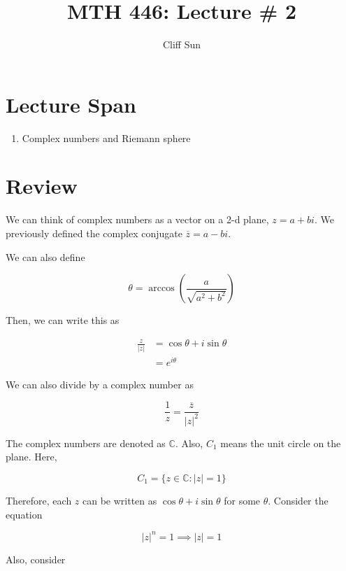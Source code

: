 \documentclass{article}
\title{MTH 446: Lecture \# 2}
\author{Cliff Sun}
\newtheorem{one minute paper}[theorem]{One Minute Paper}
\begin{document}
\maketitle

\section*{Lecture Span}
\begin{enumerate}
    \item Complex numbers and Riemann sphere
\end{enumerate}

\section*{Review}

We can think of complex numbers as a vector on a 2-d plane, $z = a + bi$. We previously defined the complex conjugate $\overline{z} = a - bi$.

We can also define 

\begin{equation}
    \theta = \arccos\left( \frac{a}{\sqrt{a^2 + b^2}} \right)
\end{equation}

Then, we can write this as 

\begin{align}
    \frac{z}{|z|} &= \cos\theta + i\sin\theta \\
    &= e^{i\theta}
\end{align}

We can also divide by a complex number as 

\begin{equation}
    \frac{1}{z} = \frac{\overline{z}}{|z|^2}
\end{equation}

The complex numbers are denoted as $\mathbb{C}$. Also, $C_1$ means the unit circle on the plane. Here, 

\begin{equation}
    C_1 = \{z \in \mathbb{C}: |z| = 1\}
\end{equation}

Therefore, each $z$ can be written as $\cos\theta + i\sin\theta$ for some $\theta$. Consider the equation 

\begin{equation}
    |z|^n = 1 \implies |z| = 1
\end{equation}

Also, consider 
\end{document}
